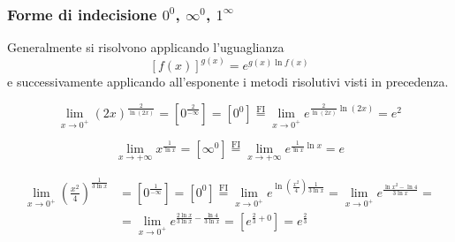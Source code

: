 \documentclass{book}     %
\begin{document}
\subsubsection{Forme di indecisione $0^0$, $\infty^0$, $1^\infty$}
Generalmente si risolvono applicando l'uguaglianza \[\left[f(x)\right]^{g(x)}=e^{g(x)\ln f(x)}\]
e successivamente applicando all'esponente i metodi risolutivi visti in precedenza.
\begin{ex}
\[\lim_{x\to0^+}(2x)^{\frac{2}{\ln(2x)}}=\left[0^\frac{2}{-\infty}\right]=\left[0^0\right]\overset{\mathrm{FI}}{=}\lim_{x\to0^+}e^{\frac{2}{\ln(2x)}\ln(2x)}=e^2\]
\end{ex}
\begin{ex}
\[\lim_{x\to+\infty}x^\frac{1}{\ln x}=\left[\infty^0\right]\overset{\mathrm{FI}}{=}\lim_{x\to+\infty}e^{\frac{1}{\ln x}\ln x}=e\]
\end{ex}
\begin{ex}
\[\begin{aligned}\lim_{x\to 0^+}\left(\frac{x^2}{4}\right)^\frac{1}{3\ln x}&=\left[0^\frac{1}{-\infty}\right]=\left[0^0\right]\overset{\mathrm{FI}}{=}\lim_{x\to0^+}e^{\ln\left(\frac{x^2}{4}\right)\frac{1}{3\ln x}}=\lim_{x\to0^+}e^{\frac{\ln x^2-\ln4}{3\ln x}} =\\&=\lim_{x\to0^+}e^{\frac{2\ln x}{3\ln x}-\frac{\ln4}{3\ln x}}=\left[e^{\frac{2}{3}+0}\right]=e^\frac{2}{3}\end{aligned}\]
\end{ex}
\end{document}
